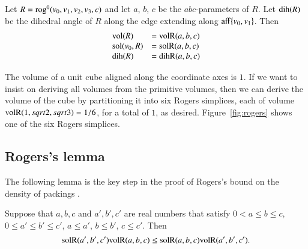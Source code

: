 \begin{lemma}\label{lemma:rog:abc} 
Let $R={\operatorname{rog}}^0(v_0,v_1,v_2,v_3,c)$ and let $a$, $b$,
$c$ be the $abc$-parameters of $R$.  Let ${\operatorname{dih}}(R)$ be the dihedral
angle of $R$ along the edge extending along ${\operatorname{aff}}\{v_0,v_1\}$.  Then
$$
\begin{array}{lll}
{\operatorname{vol}}(R) &= {\operatorname{volR}}(a,b,c)\\
{\operatorname{sol}}(v_0,R) &= {\operatorname{solR}}(a,b,c)\\
{\operatorname{dih}}(R) &= {\operatorname{dihR}}(a,b,c)\\
\end{array}
$$
\end{lemma}





\begin{remark}
The volume of a unit cube aligned along the coordinate axes is $1$.  
If we want to insist on deriving all volumes from the primitive
volumes, then we can derive the volume of the cube by partitioning
it into six Rogers simplices,
each of volume ${\operatorname{volR}}(1,sqrt2,sqrt3) = 1/6$, for a total
of $1$, as desired.  Figure~\ref{fig:rogers} shows one of the six
Rogers simplices.
\end{remark}



\subsection{Rogers's lemma}


The following lemma is the key step in the proof of Rogers's
bound on the density of packings \cite{Rog58}.

\begin{lemma} 
Suppose that $a,b,c$ and $a',b',c'$
are real numbers that satisfy $0 <a \le b \le c$, $0 \le a'\le b'\le c'$,
$a \le a'$, $b \le b'$, $c \le c'$. Then
  $$
  {\operatorname{solR}}(a',b',c'){\operatorname{volR}}(a,b,c) \le {\operatorname{solR}}(a,b,c){\operatorname{volR}}(a',b',c').
  $$
\end{lemma}

